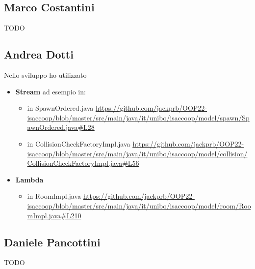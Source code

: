 \documentclass[a4paper,12pt]{report}
\begin{document}
\subsection*{Marco Costantini}
{TODO}

\subsection*{Andrea Dotti}
Nello sviluppo ho utilizzato
\begin{itemize}
\item \textbf{Stream} ad esempio in: 
    \begin{itemize}
        \item in SpawnOrdered.java \url{https://github.com/jackprb/OOP22-isaccoop/blob/master/src/main/java/it/unibo/isaccoop/model/spawn/SpawnOrdered.java#L28}
        \item in CollisionCheckFactoryImpl.java \url{https://github.com/jackprb/OOP22-isaccoop/blob/master/src/main/java/it/unibo/isaccoop/model/collision/CollisionCheckFactoryImpl.java#L56}
    \end{itemize}
\item \textbf{Lambda}     
    \begin{itemize}
        \item in RoomImpl.java \url{https://github.com/jackprb/OOP22-isaccoop/blob/master/src/main/java/it/unibo/isaccoop/model/room/RoomImpl.java#L210}
    \end{itemize}
\end{itemize}
\subsection*{Daniele Pancottini}
{TODO}
\end{document}

